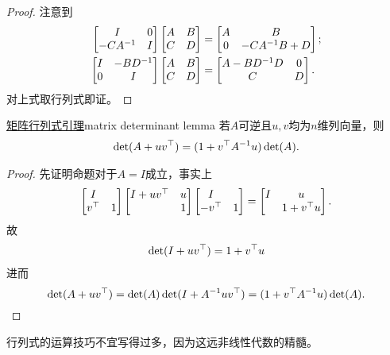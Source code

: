 \begin{proof}
	注意到
	\begin{align*}
		\begin{bmatrix}
			I&0\\-CA^{-1}&I
		\end{bmatrix}
		\begin{bmatrix}
			A&B\\C&D
		\end{bmatrix}&=
		\begin{bmatrix}
			A&B\\0&-CA^{-1} B+D
		\end{bmatrix};\\
		\begin{bmatrix}
			I&-BD^{-1}\\0&I
		\end{bmatrix}
		\begin{bmatrix}
			A&B\\C&D
		\end{bmatrix}&=
		\begin{bmatrix}
			A-BD^{-1} D&0\\C&D
		\end{bmatrix}.
	\end{align*}
	对上式取行列式即证。
\end{proof}
\begin{theorem}{\href{https://en.wikipedia.org/wiki/Matrix_determinant_lemma}{矩阵行列式引理}}{matrix determinant lemma}
	若$A$可逆且$u,v$均为$n$维列向量，则
	\begin{align}
		\det(A+uv^\top)=(1+v^\top A^{-1} u)\det(A).
	\end{align}
\end{theorem}
\begin{proof}
	先证明命题对于$A=I$成立，事实上
	\begin{align*}
		\begin{bmatrix}
			I\\v^\top&1
		\end{bmatrix}
		\begin{bmatrix}
			I+uv^\top&u\\ &1
		\end{bmatrix}
		\begin{bmatrix}
			I\\-v^\top&1
		\end{bmatrix}=
		\begin{bmatrix}
			I&u\\ &1+v^\top u
		\end{bmatrix}.
	\end{align*}
	故
	\begin{align}
		\det(I+uv^\top)=1+v^\top u
	\end{align}
	进而 
	\[
		\det(A+uv^\top)=\det(A)\det(I+A^{-1} uv^\top)=(1+v^\top A^{-1} u)\det(A).
		\qedhere
	\]
\end{proof}
行列式的运算技巧不宜写得过多，因为这远非线性代数的精髓。
